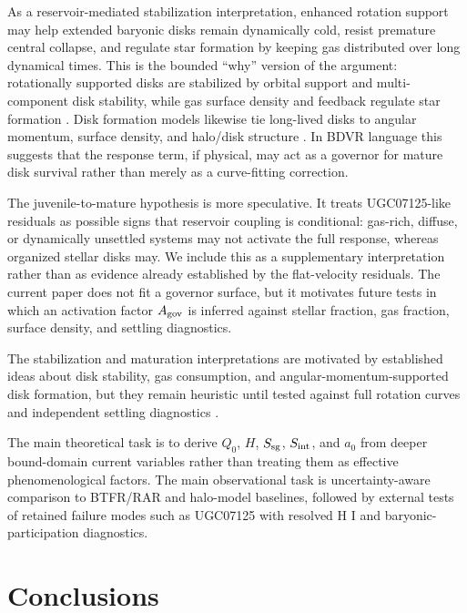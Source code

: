 \documentclass[aps,prd,preprint,nofootinbib,superscriptaddress]{revtex4-2}
\begin{document}
As a reservoir-mediated stabilization interpretation, enhanced rotation support may help extended baryonic disks remain dynamically cold, resist premature central collapse, and regulate star formation by keeping gas distributed over long dynamical times. This is the bounded ``why'' version of the argument: rotationally supported disks are stabilized by orbital support and multi-component disk stability, while gas surface density and feedback regulate star formation \cite{Toomre1964,Kennicutt1998,Bigiel2008,Leroy2008,Ostriker2011}. Disk formation models likewise tie long-lived disks to angular momentum, surface density, and halo/disk structure \cite{FallEfstathiou1980,MoMaoWhite1998,Dalcanton1997,RomeoMogotsi2017}. In BDVR language this suggests that the response term, if physical, may act as a governor for mature disk survival rather than merely as a curve-fitting correction.

The juvenile-to-mature hypothesis is more speculative. It treats UGC07125-like residuals as possible signs that reservoir coupling is conditional: gas-rich, diffuse, or dynamically unsettled systems may not activate the full response, whereas organized stellar disks may. We include this as a supplementary interpretation rather than as evidence already established by the flat-velocity residuals. The current paper does not fit a governor surface, but it motivates future tests in which an activation factor $A_{\rm gov}$ is inferred against stellar fraction, gas fraction, surface density, and settling diagnostics.

The stabilization and maturation interpretations are motivated by established ideas about disk stability, gas consumption, and angular-momentum-supported disk formation, but they remain heuristic until tested against full rotation curves and independent settling diagnostics \cite{Toomre1964,Kennicutt1998,Bigiel2008,Leroy2008,Ostriker2011,FallEfstathiou1980,MoMaoWhite1998,Dalcanton1997}.

The main theoretical task is to derive $Q_0$, $H$, $S_{\rm sg}$, $S_{\rm int}$, and $a_0$ from deeper bound-domain current variables rather than treating them as effective phenomenological factors. The main observational task is uncertainty-aware comparison to BTFR/RAR and halo-model baselines, followed by external tests of retained failure modes such as UGC07125 with resolved H I and baryonic-participation diagnostics.

\section{Conclusions}
\end{document}
